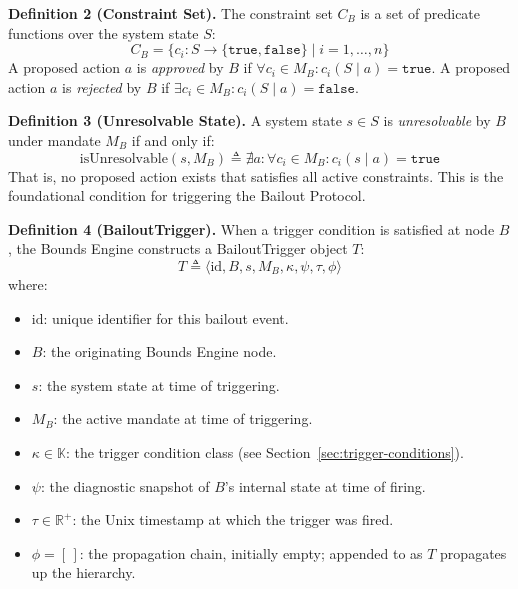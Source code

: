 \bigskip

\noindent\textbf{Definition 2 (Constraint Set).} The constraint set $C_B$ is a set of predicate functions over the system state $S$:
\begin{equation}
C_B = \{ c_i : S \rightarrow \{\texttt{true}, \texttt{false}\} \mid i = 1, \ldots, n \}
\end{equation}
A proposed action $a$ is \textit{approved} by $B$ if $\forall c_i \in M_B : c_i(S \mid a) = \texttt{true}$. A proposed action $a$ is \textit{rejected} by $B$ if $\exists c_i \in M_B : c_i(S \mid a) = \texttt{false}$.

\bigskip

\noindent\textbf{Definition 3 (Unresolvable State).} A system state $s \in S$ is \textit{unresolvable} by $B$ under mandate $M_B$ if and only if:
\begin{equation}
\text{isUnresolvable}(s, M_B) \triangleq \nexists a : \forall c_i \in M_B : c_i(s \mid a) = \texttt{true}
\end{equation}
That is, no proposed action exists that satisfies all active constraints. This is the foundational condition for triggering the Bailout Protocol.

\bigskip

\noindent\textbf{Definition 4 (BailoutTrigger).} When a trigger condition is satisfied at node $B$, the Bounds Engine constructs a BailoutTrigger object $T$:
\begin{equation}
T \triangleq \langle \text{id}, B, s, M_B, \kappa, \psi, \tau, \phi \rangle
\end{equation}
where:
\begin{itemize}\setlength\itemsep{0.25em}
\item $\text{id}$: unique identifier for this bailout event.
\item $B$: the originating Bounds Engine node.
\item $s$: the system state at time of triggering.
\item $M_B$: the active mandate at time of triggering.
\item $\kappa \in \mathbb{K}$: the trigger condition class (see Section~\ref{sec:trigger-conditions}).
\item $\psi$: the diagnostic snapshot of $B$'s internal state at time of firing.
\item $\tau \in \mathbb{R}^+$: the Unix timestamp at which the trigger was fired.
\item $\phi = [\,]$: the propagation chain, initially empty; appended to as $T$ propagates up the hierarchy.
\end{itemize}

